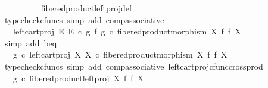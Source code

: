 \begin{isabellebody}
\ \ \ \ \ \ \ \ \isamarkupfalse%
\ fibered{\isacharunderscore}{\kern0pt}product{\isacharunderscore}{\kern0pt}left{\isacharunderscore}{\kern0pt}proj{\isacharunderscore}{\kern0pt}def\ \isamarkupfalse%
\ {\isacharparenleft}{\kern0pt}typecheck{\isacharunderscore}{\kern0pt}cfuncs{\isacharcomma}{\kern0pt}\ simp\ add{\isacharcolon}{\kern0pt}\ comp{\isacharunderscore}{\kern0pt}associative{}{\isacharparenright}{\kern0pt}\isanewline
\ \ \ \ \ \ \isamarkupfalse%
\ \isamarkupfalse%
\ {\isachardoublequoteopen}{\isachardot}{\kern0pt}{\isachardot}{\kern0pt}{\isachardot}{\kern0pt}\ {\isacharequal}{\kern0pt}\ left{\isacharunderscore}{\kern0pt}cart{\isacharunderscore}{\kern0pt}proj\ E\ E\ {\isasymcirc}\isactrlsub c\ {\isacharparenleft}{\kern0pt}g\ {\isasymtimes}\isactrlsub f\ g{\isacharparenright}{\kern0pt}\ {\isasymcirc}\isactrlsub c\ fibered{\isacharunderscore}{\kern0pt}product{\isacharunderscore}{\kern0pt}morphism\ X\ f\ f\ X{\isachardoublequoteclose}\isanewline
\ \ \ \ \ \ \ \ \isamarkupfalse%
\ {\isacharparenleft}{\kern0pt}simp\ add{\isacharcolon}{\kern0pt}\ b{\isacharunderscore}{\kern0pt}eq{\isacharparenright}{\kern0pt}\isanewline
\ \ \ \ \ \ \isamarkupfalse%
\ \isamarkupfalse%
\ {\isachardoublequoteopen}{\isachardot}{\kern0pt}{\isachardot}{\kern0pt}{\isachardot}{\kern0pt}\ {\isacharequal}{\kern0pt}\ g\ {\isasymcirc}\isactrlsub c\ left{\isacharunderscore}{\kern0pt}cart{\isacharunderscore}{\kern0pt}proj\ X\ X\ {\isasymcirc}\isactrlsub c\ fibered{\isacharunderscore}{\kern0pt}product{\isacharunderscore}{\kern0pt}morphism\ X\ f\ f\ X{\isachardoublequoteclose}\isanewline
\ \ \ \ \ \ \ \ \isamarkupfalse%
\ {\isacharparenleft}{\kern0pt}typecheck{\isacharunderscore}{\kern0pt}cfuncs{\isacharcomma}{\kern0pt}\ simp\ add{\isacharcolon}{\kern0pt}\ comp{\isacharunderscore}{\kern0pt}associative{}\ left{\isacharunderscore}{\kern0pt}cart{\isacharunderscore}{\kern0pt}proj{\isacharunderscore}{\kern0pt}cfunc{\isacharunderscore}{\kern0pt}cross{\isacharunderscore}{\kern0pt}prod{\isacharparenright}{\kern0pt}\isanewline
\ \ \ \ \ \ \isamarkupfalse%
\ \isamarkupfalse%
\ {\isachardoublequoteopen}{\isachardot}{\kern0pt}{\isachardot}{\kern0pt}{\isachardot}{\kern0pt}\ {\isacharequal}{\kern0pt}\ g\ {\isasymcirc}\isactrlsub c\ fibered{\isacharunderscore}{\kern0pt}product{\isacharunderscore}{\kern0pt}left{\isacharunderscore}{\kern0pt}proj\ X\ f\ f\ X{\isachardoublequoteclose}\isanewline
\ \ \ \ \ \ \ \ \isamarkupfalse%

\end{isabellebody}
